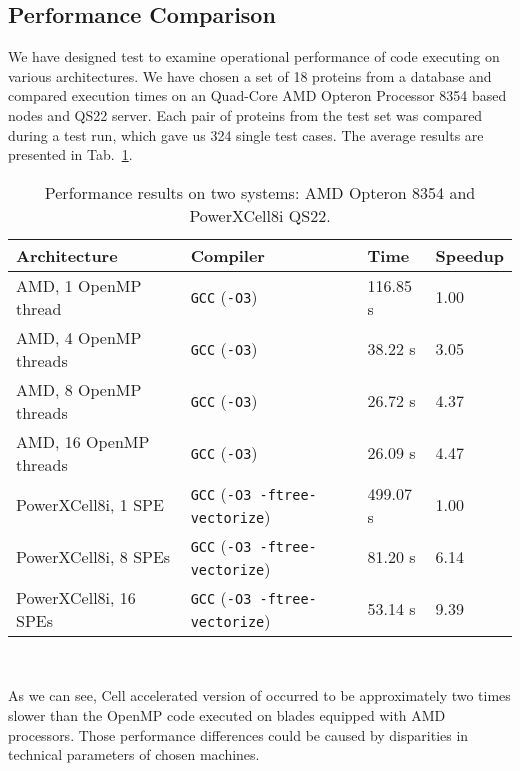 \subsection{Performance Comparison}

We have designed test to examine operational performance of \prog{} code
executing on various architectures.
We have chosen a set of 18 proteins from a database and compared execution times
on an Quad-Core AMD Opteron Processor 8354 based nodes and QS22 server.
Each pair of proteins from the test set was compared during a test run, which
gave us 324 single test cases.
The average results are presented in Tab.~\ref{tab:t4}.
\begin{table}[htb]
\begin{footnotesize}
\caption{Performance results on two systems: AMD Opteron 8354 and PowerXCell8i QS22.}
\label{tab:t4}
\newcommand{\m}{\hphantom{$-$}}
\newcommand{\cc}[1]{\multicolumn{1}{c}{#1}}
\renewcommand{\tabcolsep}{0.5pc} %
\renewcommand{\arraystretch}{1.2} %
\begin{tabular}{@{}llll}
\hline
\textbf{Architecture} & \textbf{Compiler} & \textbf{Time} & \textbf{Speedup} \\
\hline
AMD, 1 OpenMP thread & \texttt{GCC} (\texttt{-O3}) & 116.85 s & 1.00 \\
AMD, 4 OpenMP threads & \texttt{GCC} (\texttt{-O3}) & 38.22 s & 3.05 \\
AMD, 8 OpenMP threads & \texttt{GCC} (\texttt{-O3}) & 26.72 s & 4.37 \\
AMD, 16 OpenMP threads & \texttt{GCC} (\texttt{-O3}) & 26.09 s & 4.47 \\
\hline
PowerXCell8i, 1 SPE & \texttt{GCC} (\texttt{-O3 -ftree-vectorize}) & 499.07 s & 1.00 \\
PowerXCell8i, 8 SPEs & \texttt{GCC} (\texttt{-O3 -ftree-vectorize}) &  81.20 s & 6.14 \\
PowerXCell8i, 16 SPEs & \texttt{GCC} (\texttt{-O3 -ftree-vectorize}) & 53.14 s & 9.39 \\
\hline
\end{tabular}\\[2pt]
\end{footnotesize}
\end{table}
As we can see, Cell accelerated version of \prog{} occurred to be approximately
two times slower than the OpenMP code executed on blades equipped with AMD
processors.
Those performance differences could be caused by disparities in technical
parameters of chosen machines.
